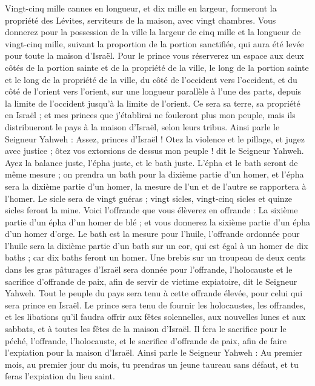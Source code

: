 \begin{multicols}{2}
Vingt-cinq mille cannes en longueur, et dix mille en largeur, formeront la propriété des Lévites, serviteurs de la maison, avec vingt chambres.
Vous donnerez pour la possession de la ville la largeur de cinq mille et la longueur de vingt-cinq mille, suivant la proportion de la portion sanctifiée, qui aura été levée pour toute la maison d'Israël.
Pour le prince vous réserverez un espace aux deux côtés de la portion sainte et de la propriété de la ville, le long de la portion sainte et le long de la propriété de la ville, du côté de l’occident  vers l’occident, et du côté de l’orient vers l’orient, sur une longueur parallèle à l’une des parts, depuis la limite de l’occident jusqu’à la limite de l’orient.
Ce sera sa terre, sa propriété en Israël ; et mes princes que j'établirai ne fouleront plus mon peuple, mais ils distribueront le pays à la maison d'Israël, selon leurs tribus.
Ainsi parle le Seigneur Yahweh : Assez, princes d'Israël ! Otez la violence et le pillage, et jugez avec justice ; ôtez vos extorsions de dessus mon peuple ! dit le Seigneur Yahweh.
Ayez la balance juste, l'épha juste, et le bath juste\FTNT{}.
L'épha et le bath seront de même mesure ; on prendra un bath pour la dixième partie d'un homer, et l'épha sera la dixième partie d'un homer, la mesure de l'un et de l'autre se rapportera à l'homer.
Le sicle sera de vingt guéras ; vingt sicles, vingt-cinq sicles et quinze sicles feront la mine\FTNT{}.
Voici l’offrande que vous élèverez en offrande : La sixième partie d'un épha d'un homer de blé ; et vous donnerez la sixième partie d'un épha d'un homer d'orge.
Le bath est la mesure pour l'huile, l'offrande ordonnée pour l'huile sera la dixième partie d'un bath sur un cor, qui est égal à un homer de dix baths ; car dix baths feront un homer.
Une brebis sur un troupeau de deux cents dans les gras pâturages d’Israël sera donnée pour l’offrande, l’holocauste et le sacrifice d’offrande de paix, afin de servir de victime expiatoire, dit le Seigneur Yahweh.
Tout le peuple du pays sera tenu à cette offrande élevée, pour celui qui sera prince en Israël.
Le prince sera tenu de fournir les holocaustes, les offrandes, et les libations qu'il faudra offrir aux fêtes solennelles, aux nouvelles lunes et aux sabbats, et à toutes les fêtes de la maison d'Israël. Il fera le sacrifice pour le péché, l’offrande, l’holocauste, et le sacrifice d’offrande de paix, afin de faire l’expiation pour la maison d'Israël.
Ainsi parle le Seigneur Yahweh : Au premier mois, au premier jour du mois, tu prendras un jeune taureau sans défaut, et tu feras l’expiation du lieu saint.

\end{multicols}
